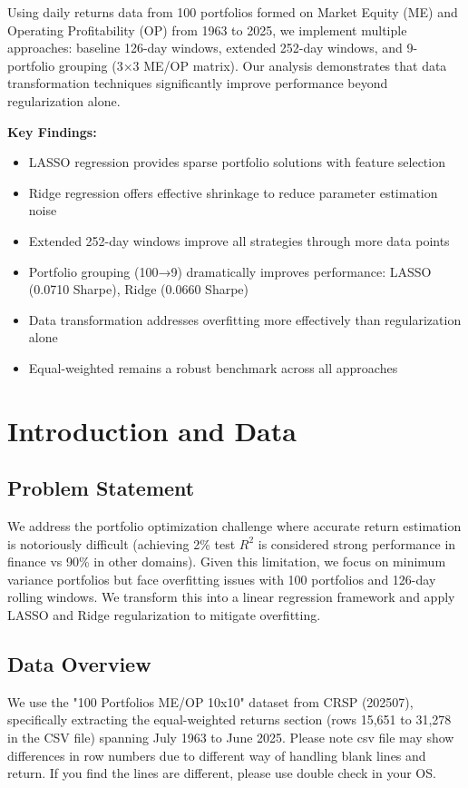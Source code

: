 \documentclass[12pt]{article}
\begin{document}
Using daily returns data from 100 portfolios formed on Market Equity (ME) and Operating Profitability (OP) from 1963 to 2025, we implement multiple approaches: baseline 126-day windows, extended 252-day windows, and 9-portfolio grouping (3×3 ME/OP matrix). Our analysis demonstrates that data transformation techniques significantly improve performance beyond regularization alone.

\textbf{Key Findings:}
\begin{itemize}
    \item LASSO regression provides sparse portfolio solutions with feature selection
    \item Ridge regression offers effective shrinkage to reduce parameter estimation noise
    \item Extended 252-day windows improve all strategies through more data points
    \item Portfolio grouping (100→9) dramatically improves performance: LASSO (0.0710 Sharpe), Ridge (0.0660 Sharpe)
    \item Data transformation addresses overfitting more effectively than regularization alone
    \item Equal-weighted remains a robust benchmark across all approaches
\end{itemize}

\section{Introduction and Data}

\subsection{Problem Statement}
We address the portfolio optimization challenge where accurate return estimation is notoriously difficult (achieving 2\% test $R^2$ is considered strong performance in finance vs 90\% in other domains). Given this limitation, we focus on minimum variance portfolios but face overfitting issues with 100 portfolios and 126-day rolling windows. We transform this into a linear regression framework and apply LASSO and Ridge regularization to mitigate overfitting.

\subsection{Data Overview}
We use the "100 Portfolios ME/OP 10x10" dataset from CRSP (202507), specifically extracting the equal-weighted returns section (rows 15,651 to 31,278 in the CSV file) spanning July 1963 to June 2025. Please note csv file may show differences in row numbers due to different way of handling blank lines and return. If you find the lines are different, please use double check in your OS.
\end{document}
